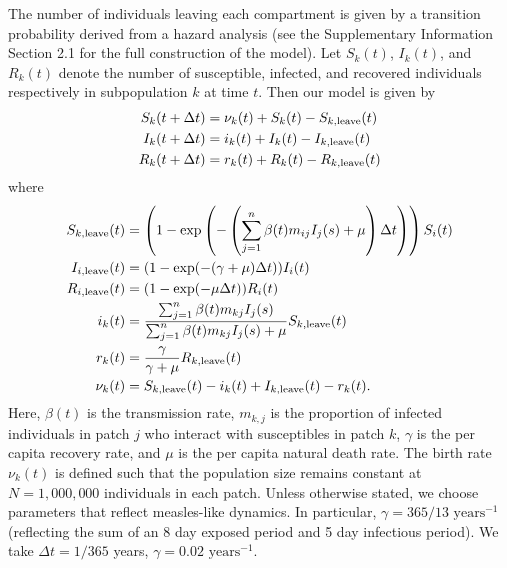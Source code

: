 \documentclass[12pt]{article}
\begin{document}
The number of individuals leaving each compartment is given by a transition probability derived from a hazard analysis (see the Supplementary Information Section 2.1 for the full construction of the model). Let $S_k(t)$, $I_k(t)$, and $R_k(t)$ denote the number of susceptible, infected, and recovered individuals respectively in subpopulation $k$ at time $t$. Then our model is given by 
\begin{equation}
\label{eq:discretedeterministic}
\begin{aligned}
S_{k}(t+\Delta t) &= \nu_k(t) + S_k(t) - S_{k, \tiny{\textrm{leave}}}(t)\\
I_{k}(t+\Delta t) &= i_k(t) + I_k(t) - I_{k, \tiny{\textrm{leave}}}(t)\\
R_{k}(t+\Delta t) &= r_k(t) + R_k(t) - R_{k, \tiny{\textrm{leave}}}(t)
\end{aligned}
\end{equation}
where 
\begin{equation} \label{eq:SIR-det}
\begin{aligned}
S_{k, {\tiny\textrm{leave}}}(t) &= \left(1 - \exp \left(-\left(\sum_{j=1}^n \beta(t) m_{ij} I_j(s) + \mu \right) \Delta t \right) \right) S_i(t)\\
I_{i, \tiny{\textrm{leave}}}(t) &= (1 - \exp(-(\gamma + \mu)\Delta t)) I_i(t) \\
R_{i, \tiny{\textrm{leave}}}(t) &= (1 - \exp(-\mu \Delta t)) R_i(t) \\
i_k(t) &= \frac{\sum_{j=1}^n \beta(t) m_{kj} I_j(s)}{\sum_{j=1}^n \beta(t) m_{kj} I_j(s) + \mu} S_{k, \tiny{\textrm{leave}}}(t)\\
r_k(t) &= \frac{\gamma}{\gamma + \mu} R_{k, \tiny{\textrm{leave}}}(t)\\
\nu_k(t) &= S_{k, \tiny{\textrm{leave}}}(t) - i_k(t) + I_{k, \tiny{\textrm{leave}}}(t) - r_k(t).
\end{aligned}
\end{equation}
Here, $\beta(t)$ is the transmission rate, $m_{k,j}$ is the proportion of infected individuals in patch $j$ who interact with susceptibles in patch $k$, $\gamma$ is the per capita recovery rate, and $\mu$ is the per capita natural death rate. The birth rate $\nu_k(t)$ is defined such that the population size remains constant at $N = 1,000, 000$ individuals in each patch. Unless otherwise stated, we choose parameters that reflect measles-like dynamics. In particular, $\gamma = 365/13 \textrm{ years}^{-1}$ (reflecting the sum of an 8 day exposed period and 5 day infectious period). We take $\Delta t = 1/365$ years, $\gamma = 0.02 \textrm{ years}^{-1}$.
\end{document}
